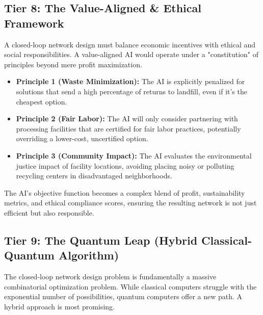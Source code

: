 \documentclass{article}
\begin{document}
\subsection{Tier 8: The Value-Aligned \& Ethical Framework}
A closed-loop network design must balance economic incentives with ethical and social responsibilities. A value-aligned AI would operate under a "constitution" of principles beyond mere profit maximization.
\begin{itemize}
    \item \textbf{Principle 1 (Waste Minimization):} The AI is explicitly penalized for solutions that send a high percentage of returns to landfill, even if it's the cheapest option.
    \item \textbf{Principle 2 (Fair Labor):} The AI will only consider partnering with processing facilities that are certified for fair labor practices, potentially overriding a lower-cost, uncertified option.
    \item \textbf{Principle 3 (Community Impact):} The AI evaluates the environmental justice impact of facility locations, avoiding placing noisy or polluting recycling centers in disadvantaged neighborhoods.
\end{itemize}
The AI's objective function becomes a complex blend of profit, sustainability metrics, and ethical compliance scores, ensuring the resulting network is not just efficient but also responsible.

\subsection{Tier 9: The Quantum Leap (Hybrid Classical-Quantum Algorithm)}
The closed-loop network design problem is fundamentally a massive combinatorial optimization problem. While classical computers struggle with the exponential number of possibilities, quantum computers offer a new path. A hybrid approach is most promising.
\end{document}
